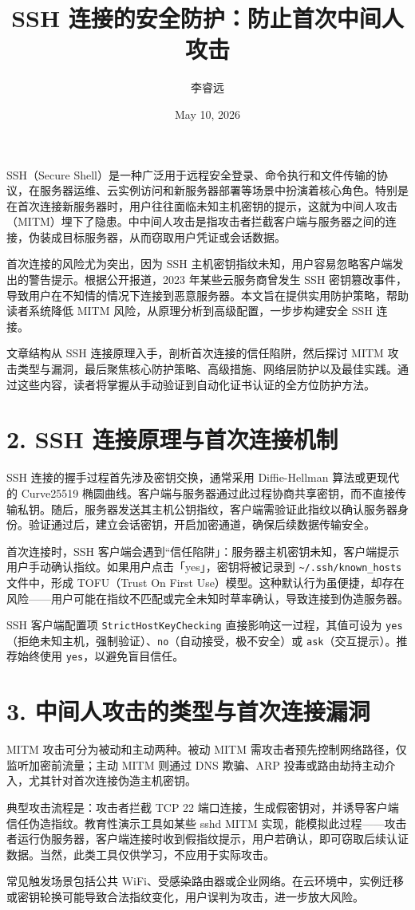 \title{SSH 连接的安全防护：防止首次中间人攻击}
\author{李睿远}
\date{May 10, 2026}
\maketitle
SSH（Secure Shell）是一种广泛用于远程安全登录、命令执行和文件传输的协议，在服务器运维、云实例访问和新服务器部署等场景中扮演着核心角色。特别是在首次连接新服务器时，用户往往面临未知主机密钥的提示，这就为中间人攻击（MITM）埋下了隐患。中中间人攻击是指攻击者拦截客户端与服务器之间的连接，伪装成目标服务器，从而窃取用户凭证或会话数据。\par
首次连接的风险尤为突出，因为 SSH 主机密钥指纹未知，用户容易忽略客户端发出的警告提示。根据公开报道，2023 年某些云服务商曾发生 SSH 密钥篡改事件，导致用户在不知情的情况下连接到恶意服务器。本文旨在提供实用防护策略，帮助读者系统降低 MITM 风险，从原理分析到高级配置，一步步构建安全 SSH 连接。\par
文章结构从 SSH 连接原理入手，剖析首次连接的信任陷阱，然后探讨 MITM 攻击类型与漏洞，最后聚焦核心防护策略、高级措施、网络层防护以及最佳实践。通过这些内容，读者将掌握从手动验证到自动化证书认证的全方位防护方法。\par
\chapter{2. SSH 连接原理与首次连接机制}
SSH 连接的握手过程首先涉及密钥交换，通常采用 Diffie-Hellman 算法或更现代的 Curve25519 椭圆曲线。客户端与服务器通过此过程协商共享密钥，而不直接传输私钥。随后，服务器发送其主机公钥指纹，客户端需验证此指纹以确认服务器身份。验证通过后，建立会话密钥，开启加密通道，确保后续数据传输安全。\par
首次连接时，SSH 客户端会遇到“信任陷阱」：服务器主机密钥未知，客户端提示用户手动确认指纹。如果用户点击「yes」，密钥将被记录到 \texttt{\~{}/.ssh/known\_{}hosts} 文件中，形成 TOFU（Trust On First Use）模型。这种默认行为虽便捷，却存在风险——用户可能在指纹不匹配或完全未知时草率确认，导致连接到伪造服务器。\par
SSH 客户端配置项 \texttt{StrictHostKeyChecking} 直接影响这一过程，其值可设为 \texttt{yes}（拒绝未知主机，强制验证）、\texttt{no}（自动接受，极不安全）或 \texttt{ask}（交互提示）。推荐始终使用 \texttt{yes}，以避免盲目信任。\par
\chapter{3. 中间人攻击的类型与首次连接漏洞}
MITM 攻击可分为被动和主动两种。被动 MITM 需攻击者预先控制网络路径，仅监听加密前流量；主动 MITM 则通过 DNS 欺骗、ARP 投毒或路由劫持主动介入，尤其针对首次连接伪造主机密钥。\par
典型攻击流程是：攻击者拦截 TCP 22 端口连接，生成假密钥对，并诱导客户端信任伪造指纹。教育性演示工具如某些 sshd MITM 实现，能模拟此过程——攻击者运行伪服务器，客户端连接时收到假指纹提示，用户若确认，即可窃取后续认证数据。当然，此类工具仅供学习，不应用于实际攻击。\par
常见触发场景包括公共 WiFi、受感染路由器或企业网络。在云环境中，实例迁移或密钥轮换可能导致合法指纹变化，用户误判为攻击，进一步放大风险。\par
